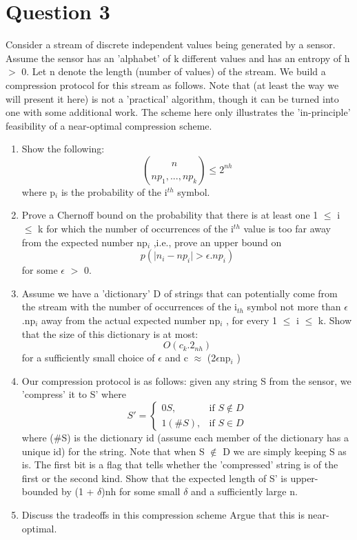 \documentclass[12pt,a4paper]{article}
\begin{document}
\section{Question 3}
Consider a stream of discrete independent values being generated by a sensor. Assume the sensor has an ’alphabet’ of k different values and has an entropy of h $>$ 0. Let n denote the length (number of values) of the stream. We build a compression protocol for this stream as follows. Note that (at least the way we will present it here) is not a ’practical’ algorithm, though it can be turned into one with some additional work. The scheme here only illustrates the ’in-principle’ feasibility of a near-optimal compression scheme.
\begin{enumerate}[label=\alph*]
    \item Show the following:
    \begin{equation*}
    \binom{n}{np_{1},...,np_{k}} \leq 2^{nh}
    \end{equation*}
    where p$_{i}$ is the probability of the i$^{th}$ symbol.
    \item Prove a Chernoff bound on the probability that there is at least one 1 $\leq$ i $\leq$ k for which the number of occurrences of the i$^{th}$ value is too far away from the expected number np$_{i}$ ,i.e., prove an upper bound on 
    \begin{equation*}
    p( \lvert n_{i} - np_{i} \rvert > \epsilon.np_{i})
    \end{equation*}
    for some $\epsilon$ $>$ 0.
    \item Assume we have a ’dictionary’ D of strings that can potentially come from the stream with the number of occurrences of the i$_{th}$ symbol not more than $\epsilon$.np$_{i}$ away from the actual expected number np$_{i}$ , for every 1 $\leq$ i $\leq$ k. Show that the size of this dictionary is at most:
    \begin{equation*}
        O(c_{k}.2_{nh})
    \end{equation*}
    for a sufficiently small choice of $\epsilon$ and c $\approx$ (2$\epsilon$np$_{i}$ )
    \item Our compression protocol is as follows: given any string S from the sensor, we ’compress’ it to S' where
    \begin{equation*}
    S'= 
        \begin{cases}
            0S, & \text{if } S \notin D\\
            1(\#S),  & \text{if } S \in D
        \end{cases}
    \end{equation*}
    where (\#S) is the dictionary id (assume each member of the dictionary has a unique id) for the string. Note that when S $\notin$ D we are simply keeping S as is. The first bit is a flag that tells whether the ’compressed’ string is of the first or the second kind. Show that the expected length of S' is upper-bounded by (1 + $\delta$)nh for some small $\delta$ and a sufficiently large n.
    \item Discuss the tradeoffs in this compression scheme Argue that this is near-optimal.
\end{enumerate}
\end{document}
